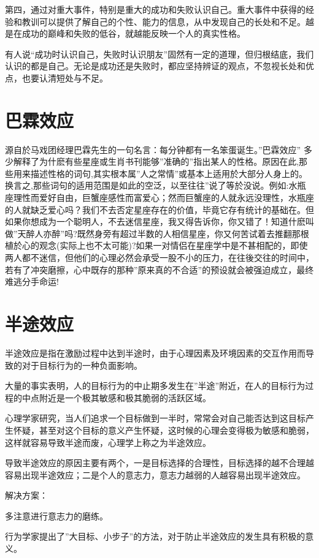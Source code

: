 \documentclass[11pt]{ctexart}
\begin{document}
第四，通过对重大事件，特别是重大的成功和失败认识自己。重大事件中获得的经验和教训可以提供了解自己的个性、能力的信息，从中发现自己的长处和不足。越是在成功的巅峰和失败的低谷，就越能反映一个人的真实性格。

有人说“成功时认识自己，失败时认识朋友”固然有一定的道理，但归根结底，我们认识的都是自己。无论是成功还是失败时，都应坚持辨证的观点，不忽视长处和优点，也要认清短处与不足。
\section{巴霖效应}
\label{sec-7}


源自於马戏团经理巴霖先生的一句名言：每分钟都有一名笨蛋诞生。”巴霖效应” 多少解释了为什麽有些星座或生肖书刊能够”准确的”指出某人的性格。原因在此,那些用来描述性格的词句,其实根本属”人之常情”或基本上适用於大部分人身上的。换言之,那些词句的适用范围是如此的空泛，以至往往”说了等於没说。例如:水瓶座理性而爱好自由，巨蟹座感性而富爱心；然而巨蟹座的人就永远没理性，水瓶座的人就缺乏爱心吗？我们不去否定星座存在的价值，毕竟它存有统计的基础在。但如果你想成为一个聪明人，不去迷信星座，我又得告诉你，你又错了！知道什麽叫做”天醉人亦醉”吗?既然身旁有超过半数的人相信星座，你又何苦试着去推翻那根植於心的观念(实际上也不太可能)?如果一对情侣在星座学中是不甚相配的，即使两人都不迷信，但他们的心理必然会承受一股不小的压力，在往後交往的时间中，若有了冲突磨擦，心中既存的那种”原来真的不合适”的预设就会被强迫成立，最终难逃分手命运!
\section{半途效应}
\label{sec-8}


半途效应是指在激励过程中达到半途时，由于心理因素及环境因素的交互作用而导致的对于目标行为的一种负面影响。

大量的事实表明，人的目标行为的中止期多发生在''半途''附近，在人的目标行为过程的中点附近是一个极其敏感和极其脆弱的活跃区域。

心理学家研究，当人们追求一个目标做到一半时，常常会对自己能否达到这目标产生怀疑，甚至对这个目标的意义产生怀疑，这时候的心理会变得极为敏感和脆弱，这样就容易导致半途而废，心理学上称之为半途效应。

导致半途效应的原因主要有两个，一是目标选择的合理性，目标选择的越不合理越容易出现半途效应；二是个人的意志力，意志力越弱的人越容易出现半途效应。

解决方案：

多注意进行意志力的磨练。

行为学家提出了''大目标、小步子''的方法，对于防止半途效应的发生具有积极的意义。
\end{document}
